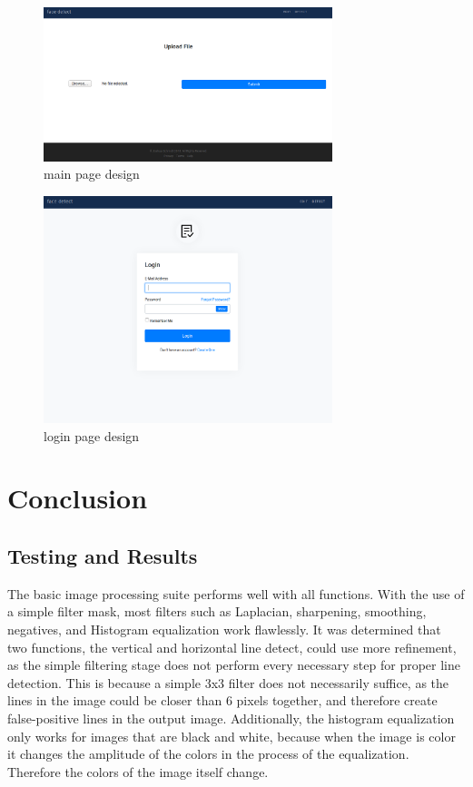 \documentclass{article}
\let\Oldsection\section
\renewcommand{\section}{\FloatBarrier\Oldsection}
\let\Oldsubsection\subsection
\renewcommand{\subsection}{\FloatBarrier\Oldsubsection}
\begin{document}
  \begin{figure}[!htb]
    \centering
    \includegraphics[width=0.75\textwidth]{assets/main_page.png}
    \caption{main page design}
    \label{fig:main-page}
  \end{figure}

  \begin{figure}[!htb]
    \centering
    \includegraphics[width=0.75\textwidth]{assets/login.png}
    \caption{login page design}
    \label{fig:login-page}
  \end{figure}

  \newpage

  \section{Conclusion}

  \subsection{Testing and Results}

  The basic image processing suite performs well with all functions. With the use of a simple filter mask, most filters such as Laplacian, sharpening, smoothing, negatives, and Histogram equalization work flawlessly. It was determined that two functions, the vertical and horizontal line detect, could use more refinement, as the simple filtering stage does not perform every necessary step for proper line detection. This is because a simple 3x3 filter does not necessarily suffice, as the lines in the image could be closer than 6 pixels together, and therefore create false-positive lines in the output image. Additionally, the histogram equalization only works for images that are black and white, because when the image is color it changes the amplitude of the colors in the process of the equalization. Therefore the colors of the image itself change.
\end{document}
